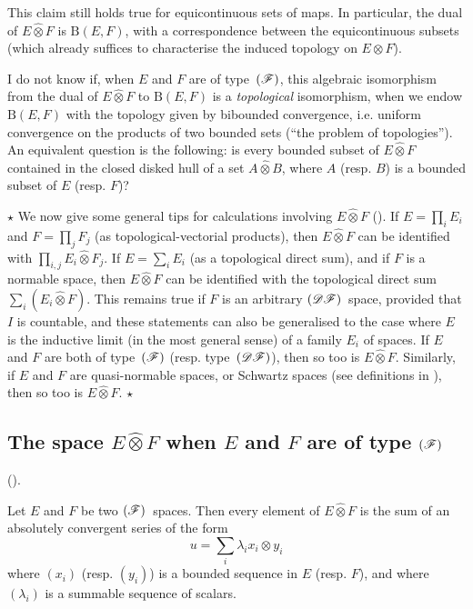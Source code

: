\documentclass{article}
\theoremstyle{plain}
\newenvironment{theorem}[1]
    {\renewcommand\theinnercustomtheorem{#1}\innercustomtheorem}
    {\endinnercustomtheorem}
\newcommand{\aster}[1]{$\star${#1}$\star$}
\newcommand{\BB}{\mathrm{B}}
\newcommand{\DF}{\mbox{\normalfont($\mathscr{DF}$)}}
\newcommand{\FF}{\mbox{\normalfont($\mathscr{F}$)}}
\newcommand{\hotimes}{\widehat{\otimes}}
\newcommand{\oldpage}[1]{\marginpar{\footnotesize$\Big\vert$ \textit{p.~#1}}}
\begin{document}
This claim still holds true for equicontinuous sets of maps.
In particular, the dual of $E\hotimes F$ is $\BB(E,F)$, with a correspondence between the equicontinuous subsets (which already suffices to characterise the induced topology on $E\otimes F$).

I do not know if, when $E$ and $F$ are of type~$\FF$, this algebraic isomorphism from the dual of $E\hotimes F$ to $\BB(E,F)$ is a \emph{topological} isomorphism, when we endow $\BB(E,F)$ with the topology given by bibounded convergence, i.e. uniform convergence on the products of two bounded sets (``the problem of topologies'').
An equivalent question is the following:
is every bounded subset of $E\hotimes F$ contained in the closed disked hull of a set $A\hotimes B$, where $A$ (resp. $B$) is a bounded subset of $E$ (resp. $F$)?

\aster{%
  We now give some general tips for calculations involving $E\hotimes F$ (\cite[chap.~I, \S1, n\textsuperscript{o}~3]{PTT}).
  If $E=\prod_i E_i$ and $F=\prod_j F_j$ (as topological-vectorial products), then $E\hotimes F$ can be identified with $\prod_{i,j}E_i\hotimes F_j$.
  If $E=\sum_i E_i$ (as a topological direct sum), and if $F$ is a normable space, then $E\hotimes F$ can be identified with the topological direct sum $\sum_i(E_i\hotimes F)$.
  This remains true if $F$ is an arbitrary $\DF$~space, provided that $I$ is countable, and these statements can also be generalised to the case where $E$ is the inductive limit (in the most general sense) of a family $E_i$ of spaces.
  If $E$ and $F$ are both of type~$\FF$ (resp. type~$\DF$), then so too is $E\hotimes F$.
  Similarly, if $E$ and $F$ are quasi-normable spaces, or Schwartz spaces (see definitions in \cite[\S3]{6}), then so too is $E\hotimes F$.
}

\oldpage{78}
\subsection{The space \texorpdfstring{$E\hotimes F$}{EF} when \texorpdfstring{$E$}{E} and \texorpdfstring{$F$}{F} are of type \texorpdfstring{$\FF$}{(F)}}
\label{subsection:E-hotimes-F-type-FF}

(\cite[chap.~1, §2, n\textsuperscript{o}~1]{PTT}).
\medskip

\begin{theorem}{2}
\label{theorem2}
  Let $E$ and $F$ be two $\FF$~spaces.
  Then every element of $E\hotimes F$ is the sum of an absolutely convergent series of the form
  \[
    u = \sum_i \lambda_i x_i \otimes y_i
  \]
  where $(x_i)$ (resp. $(y_i)$) is a bounded sequence in $E$ (resp. $F$), and where $(\lambda_i)$ is a summable sequence of scalars.
\end{theorem}
\end{document}
